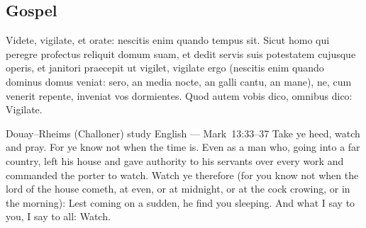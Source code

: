 \subsection{Gospel}\label{proper-gospel}
\begin{latinproper}
Videte, vigilate, et orate: nescitis enim quando tempus sit. Sicut homo qui peregre profectus reliquit domum suam, et dedit servis suis potestatem cujusque operis, et janitori praecepit ut vigilet, vigilate ergo (nescitis enim quando dominus domus veniat: sero, an media nocte, an galli cantu, an mane), ne, cum venerit repente, inveniat vos dormientes. Quod autem vobis dico, omnibus dico: Vigilate.
\end{latinproper}
\begin{englishwitness}{Douay--Rheims (Challoner) study English --- Mark~13:33--37}
Take ye heed, watch and pray. For ye know not when the time is. Even as a man who, going into a far country, left his house and gave authority to his servants over every work and commanded the porter to watch. Watch ye therefore (for you know not when the lord of the house cometh, at even, or at midnight, or at the cock crowing, or in the morning): Lest coming on a sudden, he find you sleeping. And what I say to you, I say to all: Watch.
\end{englishwitness}

